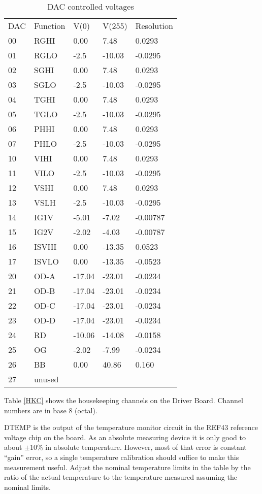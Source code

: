 \begin{table}[h]
\centering
\begin{tabular}{|l|l|l|l|l|}
\hline
DAC & Function & V(0) & V(255) & Resolution \\
00 & RGHI & 0.00 & 7.48 & 0.0293 \\
01 & RGLO & -2.5 & -10.03 & -0.0295 \\
02 & SGHI & 0.00 & 7.48 & 0.0293 \\
03 & SGLO & -2.5 & -10.03 & -0.0295 \\
04 & TGHI & 0.00 & 7.48 & 0.0293 \\
05 & TGLO & -2.5 & -10.03 & -0.0295 \\
06 & PHHI & 0.00 & 7.48 & 0.0293 \\
07 & PHLO & -2.5 & -10.03 & -0.0295 \\
10 & VIHI & 0.00 & 7.48 & 0.0293 \\
11 & VILO & -2.5 & -10.03 & -0.0295 \\
12 & VSHI & 0.00 & 7.48 & 0.0293 \\
13 & VSLH & -2.5 & -10.03 & -0.0295 \\
14 & IG1V & -5.01 & -7.02 & -0.00787 \\
15 & IG2V & -2.02 & -4.03 & -0.00787 \\
16 & ISVHI & 0.00 & -13.35 & 0.0523 \\
17 & ISVLO & 0.00 & -13.35 & -0.0523 \\
20 & OD-A & -17.04 & -23.01 & -0.0234 \\
21 & OD-B & -17.04 & -23.01 & -0.0234 \\
22 & OD-C & -17.04 & -23.01 & -0.0234 \\
23 & OD-D & -17.04 & -23.01 & -0.0234 \\
24 & RD & -10.06 & -14.08 & -0.0158 \\
25 & OG & -2.02 & -7.99 & -0.0234 \\
26 & BB & 0.00 & 40.86 & 0.160 \\
27 & unused & & & \\
\hline
\end{tabular}
\caption{DAC controlled voltages}
\label{DACV}
\end{table}

Table \ref{HKC} shows the housekeeping channels on the Driver Board. Channel numbers are in base 8 (octal). 

DTEMP is the output of the temperature monitor circuit in the REF43 reference voltage chip on the board. As an absolute measuring device it is only good to about $\pm$10\% in absolute temperature. However, most of that error is constant ``gain'' error, so a single temperature calibration should suffice to make this measurement useful. Adjust the nominal temperature limits in the table by the ratio of the actual temperature to the temperature measured assuming the nominal limits.

